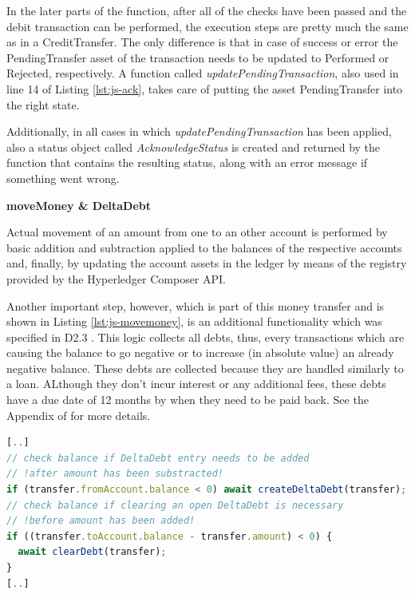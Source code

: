 In the later parts of the function, after all of the checks have been passed and the debit transaction can be performed, the execution steps are pretty much the same as in a CreditTransfer. The only difference is that in case of success or error the PendingTransfer asset of the transaction needs to be updated to Performed or Rejected, respectively. A function called \textit{updatePendingTransaction}, also used in line 14 of Listing \ref{lst:js-ack}, takes care of putting the asset PendingTransfer into the right state.

Additionally, in all cases in which \textit{updatePendingTransaction} has been applied, also a status object called \textit{AcknowledgeStatus} is created and returned by the function that contains the resulting status, along with an error message if something went wrong.

\textbf{moveMoney \& DeltaDebt}

Actual movement of an amount from one to an other account is performed by basic addition and subtraction applied to the balances of the respective accounts and, finally, by updating the account assets in the ledger by means of the registry provided by the Hyperledger Composer API.

Another important step, however, which is part of this money transfer and is shown in Listing \ref{lst:js-movemoney}, is an additional functionality which was specified in D2.3 \cite{INTERLACE_D23}. This logic collects all debts, thus, every transactions which are causing the balance to go negative or to increase (in absolute value) an already negative balance. These debts are collected because they are handled similarly to a loan. ALthough they don't incur interest or any additional fees, these debts have a due date of 12 months by when they need to be paid back. See the Appendix of \cite{INTERLACE_D23} for more details.

\begin{center}
\begin{minipage}{0.8\textwidth}
\small
\begin{lstlisting}[language=javascript,firstnumber=1,caption={\bf\small moveMoney JavaScript excerpt}, captionpos=b,label=lst:js-movemoney]
[..]
// check balance if DeltaDebt entry needs to be added
// !after amount has been substracted!
if (transfer.fromAccount.balance < 0) await createDeltaDebt(transfer);
// check balance if clearing an open DeltaDebt is necessary
// !before amount has been added!
if ((transfer.toAccount.balance - transfer.amount) < 0) {
  await clearDebt(transfer);
}
[..]
\end{lstlisting}
\end{minipage}
\end{center}

